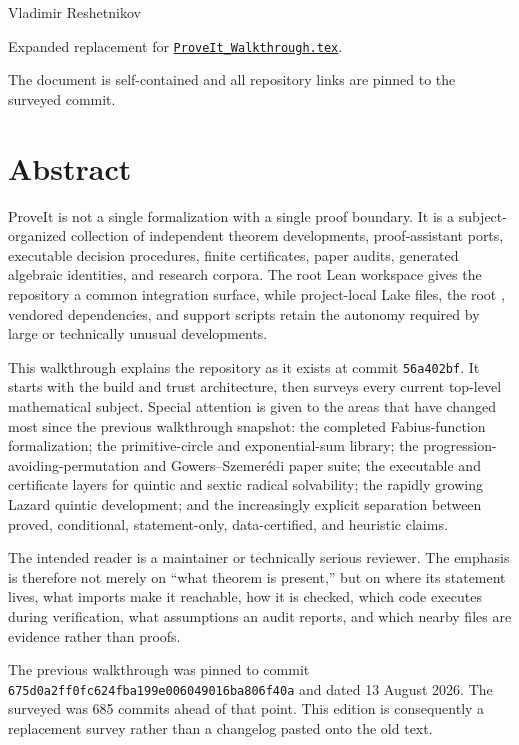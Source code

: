 \documentclass[
  10pt,
  a4paper,
  twoside,
  open=any,
  parskip=half,
  headings=big
]{scrreprt}
\newcommand{\CommitFull}{56a402bf82a9aab119fcbe3e96b991d387b221c5}
\newcommand{\CommitShort}{56a402bf}
\newcommand{\PreviousCommit}{675d0a2ff0fc624fba199e006049016ba806f40a}
\newcommand{\RepoWeb}{https://github.com/VladimirReshetnikov/ProveIt}
\newcommand{\RepoBlobBase}{\RepoWeb/blob/\CommitFull}
\newcommand{\code}[1]{\texttt{\detokenize{#1}}}
\newcommand{\project}[1]{\textsf{#1}}
\newcommand{\RepoFile}[1]{\href{\RepoBlobBase/#1}{\nolinkurl{#1}}}
\begin{document}
\begin{titlepage}
\vfill
{\large Vladimir Reshetnikov\par}
\vspace{2mm}
{\small Expanded replacement for \RepoFile{ProveIt_Walkthrough.tex}.\par}
{\small The document is self-contained and all repository links are pinned to the surveyed commit.\par}
\end{titlepage}

\chapter*{Abstract}

\project{ProveIt} is not a single formalization with a single proof boundary. It is a subject-organized collection of independent theorem developments, proof-assistant ports, executable decision procedures, finite certificates, paper audits, generated algebraic identities, and research corpora. The root Lean workspace gives the repository a common integration surface, while project-local Lake files, the root \code{_CoqProject}, vendored dependencies, and support scripts retain the autonomy required by large or technically unusual developments.

This walkthrough explains the repository as it exists at commit \texttt{\CommitShort}. It starts with the build and trust architecture, then surveys every current top-level mathematical subject. Special attention is given to the areas that have changed most since the previous walkthrough snapshot: the completed Fabius-function formalization; the primitive-circle and exponential-sum library; the progression-avoiding-permutation and Gowers--Szemer\'edi paper suite; the executable and certificate layers for quintic and sextic radical solvability; the rapidly growing Lazard quintic development; and the increasingly explicit separation between proved, conditional, statement-only, data-certified, and heuristic claims.

The intended reader is a maintainer or technically serious reviewer. The emphasis is therefore not merely on ``what theorem is present,'' but on where its statement lives, what imports make it reachable, how it is checked, which code executes during verification, what assumptions an audit reports, and which nearby files are evidence rather than proofs.

\begin{statusbox}
The previous walkthrough was pinned to commit \texttt{\PreviousCommit} and dated 13 August 2026. The surveyed \code{main} was 685 commits ahead of that point. This edition is consequently a replacement survey rather than a changelog pasted onto the old text.
\end{statusbox}
\end{document}
